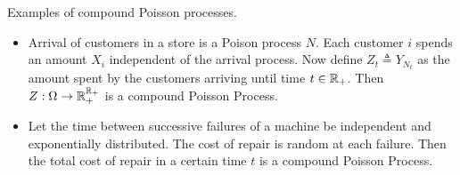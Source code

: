 \documentclass[a4paper,english,10pt]{article}
\begin{document}
\begin{shaded*}
\begin{exmp}  Examples of compound Poisson processes. 
\begin{itemize}
\item Arrival of customers in a store is a Poison process $N$. 
Each customer $i$ spends an \iid amount $X_i$ independent of the arrival process. 
Now define $Z_t \triangleq Y_{N_t}$ as the amount spent by the customers arriving until time $t \in \mathbb{R}_+$. 
Then $Z:\Omega\to\mathbb{R}_+^{\mathbb{R}_+}$ is a compound Poisson Process.
\item Let the time between successive failures of a machine be independent and exponentially distributed. 
The cost of repair is \iid random at each failure. 
Then the total cost of repair in a certain time $t$ is a compound Poisson Process. 
\end{itemize}
\end{exmp}
\end{shaded*}
\end{document}
